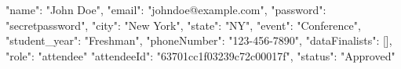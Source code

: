 {
  "name": "John Doe",
  "email": "johndoe@example.com",
  "password": "secretpassword",
  "city": "New York",
  "state": "NY",
  "event": "Conference",
  "student_year": "Freshman",
  "phoneNumber": "123-456-7890",
  "dataFinalists": [],
  "role": "attendee"
}
{
  "attendeeId": "63701cc1f03239c72c00017f",
  "status": "Approved"
}